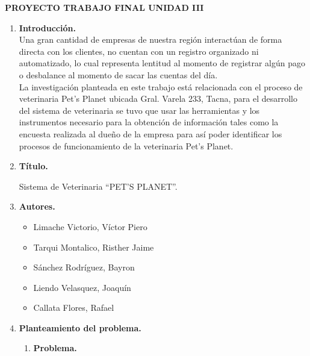 \documentclass[12pt,a4paper,oneside]{book}
\begin{document}
	\newpage
	
	\begin{center} 
		\LARGE{\bf PROYECTO TRABAJO FINAL \newline UNIDAD III }\\ \vspace{.25cm}
	\end{center}

	
	\begin{enumerate}
		
		\item \textbf{Introducci\'on.} \\
		
				Una gran cantidad de empresas de nuestra región interactúan de forma directa con los clientes, no cuentan con un registro organizado ni automatizado, lo cual representa lentitud al momento de registrar algún pago o desbalance al momento de sacar las cuentas del d\'ia. \\
				
				La investigaci\'on planteada en este trabajo est\'a relacionada con el proceso de veterinaria Pet’s Planet ubicada Gral. Varela 233, Tacna, para el desarrollo del sistema de veterinaria se tuvo que usar las herramientas y los instrumentos necesario para la obtención de información tales como la encuesta realizada al dueño de la empresa para así poder identificar los procesos de funcionamiento de la veterinaria Pet’s Planet.\\
		
		
		\item \textbf{T\'itulo.}
		
				Sistema de Veterinaria “PET’S PLANET”.	
				
		\item \textbf{Autores.}
		
				\begin{itemize}
					
					\item	Limache Victorio, V\'ictor Piero 
					\item	Tarqui Montalico, Risther Jaime 
					\item	S\'anchez Rodr\'iguez, Bayron 
					\item	Liendo Velasquez, Joaqu\'in 
					\item	Callata Flores, Rafael 
					
				\end{itemize}
			
		\item \textbf{Planteamiento del problema.}
				\begin{enumerate}
					\item \textbf{Problema.} \\
					

\end{enumerate}
\end{enumerate}
\end{document}
